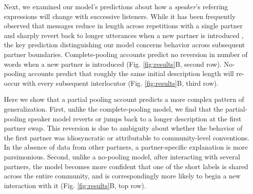 Next, we examined our model's predictions about how a \emph{speaker}'s referring expressions will change with successive listeners.
While it has been frequently observed that messages reduce in length across repetitions with a single partner \cite{krauss_changes_1964} and sharply revert back to longer utterances when a new partner is introduced \cite{wilkes-gibbs_coordinating_1992}, the key prediction distinguishing our model concerns behavior across subsequent partner boundaries.
Complete-pooling accounts predict no reversion in number of words when a new partner is introduced  (Fig. \ref{fig:results}B, second row).
No-pooling accounts predict that roughly the same initial description length will re-occur with every subsequent interlocutor  (Fig. \ref{fig:results}B, third row). 

Here we show that a partial pooling account predicts a more complex pattern of generalization.
First, unlike the complete-pooling model, we find that the partial-pooling speaker model reverts or jumps back to a longer description at the first partner swap.
This reversion is due to ambiguity about whether the behavior of the first partner was idiosyncratic or attributable to community-level conventions.
In the absence of data from other partners, a partner-specific explanation is more parsimonious.
Second, unlike a no-pooling model, after interacting with several partners, the model becomes more confident that one of the short labels is shared across the entire community, and is correspondingly more likely to begin a new interaction with it (Fig. \ref{fig:results}B, top row).


